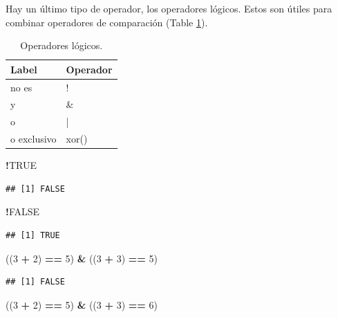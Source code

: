 \documentclass[]{book}
\newenvironment{Shaded}{\begin{snugshade}}{\end{snugshade}}
\newcommand{\DecValTok}[1]{\textcolor[rgb]{0.00,0.00,0.81}{#1}}
\newcommand{\StringTok}[1]{\textcolor[rgb]{0.31,0.60,0.02}{#1}}
\newcommand{\OtherTok}[1]{\textcolor[rgb]{0.56,0.35,0.01}{#1}}
\newcommand{\OperatorTok}[1]{\textcolor[rgb]{0.81,0.36,0.00}{\textbf{#1}}}
\newcommand{\NormalTok}[1]{#1}
\begin{document}
Hay un último tipo de operador, los operadores lógicos. Estos son útiles
para combinar operadores de comparación (Table \ref{tab:tabOpLog}).

\begin{table}

\caption{\label{tab:tabOpLog}Operadores lógicos.\label{tab:tabOpLog}}
\centering
\begin{tabular}[t]{l|l}
\hline
Label & Operador\\
\hline
no es & !\\
\hline
y & \&\\
\hline
o & |\\
\hline
o exclusivo & xor()\\
\hline
\end{tabular}
\end{table}

\begin{Shaded}
\begin{Highlighting}[]
\OperatorTok{!}\OtherTok{TRUE}
\end{Highlighting}
\end{Shaded}

\begin{verbatim}
## [1] FALSE
\end{verbatim}

\begin{Shaded}
\begin{Highlighting}[]
\OperatorTok{!}\OtherTok{FALSE}
\end{Highlighting}
\end{Shaded}

\begin{verbatim}
## [1] TRUE
\end{verbatim}

\begin{Shaded}
\begin{Highlighting}[]
\NormalTok{((}\DecValTok{3} \OperatorTok{+}\StringTok{ }\DecValTok{2}\NormalTok{) }\OperatorTok{==}\StringTok{ }\DecValTok{5}\NormalTok{) }\OperatorTok{&}\StringTok{ }\NormalTok{((}\DecValTok{3} \OperatorTok{+}\StringTok{ }\DecValTok{3}\NormalTok{) }\OperatorTok{==}\StringTok{ }\DecValTok{5}\NormalTok{)}
\end{Highlighting}
\end{Shaded}

\begin{verbatim}
## [1] FALSE
\end{verbatim}

\begin{Shaded}
\begin{Highlighting}[]
\NormalTok{((}\DecValTok{3} \OperatorTok{+}\StringTok{ }\DecValTok{2}\NormalTok{) }\OperatorTok{==}\StringTok{ }\DecValTok{5}\NormalTok{) }\OperatorTok{&}\StringTok{ }\NormalTok{((}\DecValTok{3} \OperatorTok{+}\StringTok{ }\DecValTok{3}\NormalTok{) }\OperatorTok{==}\StringTok{ }\DecValTok{6}\NormalTok{)}
\end{Highlighting}
\end{Shaded}
\end{document}
